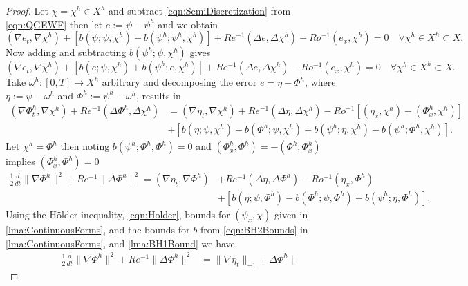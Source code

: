 \begin{proof}
  Let $\chi = \chi^h \in X^h$ and subtract \eqref{eqn:SemiDiscretization} from
  \eqref{eqn:QGEWF} then let $e:=\psi - \psi^h$ and we obtain
  \begin{equation*}
    (\nabla e_t, \nabla \chi^h) + \left[b(\psi;\psi,\chi^h) - b(\psi^h;\psi^h,\chi^h)\right]
      + Re^{-1}(\Delta e, \Delta \chi^h) - Ro^{-1} (e_x, \chi^h) = 0\quad
      \forall \chi^h \in X^h \subset X.
  \end{equation*}
  Now adding and subtracting $b(\psi^h;\psi,\chi^h)$ gives
  \begin{equation*}
    (\nabla e_t, \nabla \chi^h) + \left[b(e;\psi,\chi^h) + b(\psi^h;e,\chi^h)\right]
      + Re^{-1}(\Delta e, \Delta \chi^h) - Ro^{-1} (e_x, \chi^h) = 0\quad
      \forall \chi^h \in X^h \subset X.
  \end{equation*}
  Take $\omega^h:[0,T] \to X^h$ arbitrary and decomposing the error $e = \eta -
  \Phi^h$, where $\eta := \psi - \omega^h$ and $\Phi^h := \psi^h - \omega^h$,
  results in
  \begin{align*}
    (\nabla \Phi^h_t, \nabla \chi^h) + Re^{-1}(\Delta \Phi^h, \Delta \chi^h)
      & = (\nabla \eta_t, \nabla \chi^h) + Re^{-1}(\Delta \eta, \Delta \chi^h)
      - Ro^{-1} \left[(\eta_x, \chi^h) - (\Phi^h_x, \chi^h)\right] \\
    & + \left[ b(\eta;\psi,\chi^h) - b(\Phi^h;\psi,\chi^h)
      + b(\psi^h;\eta,\chi^h) - b(\psi^h;\Phi^h,\chi^h)\right].
  \end{align*}
  Let $\chi^h = \Phi^h$ then noting $b(\psi^h;\Phi^h,\Phi^h) = 0$ and $(\Phi^h_x,
  \Phi^h) = -(\Phi^h,\Phi^h_x)$ implies $(\Phi^h_x,\Phi^h) = 0$
  \begin{align*}
    \frac{1}{2} \frac{d}{dt} \|\nabla \Phi^h\|^2 + Re^{-1}\|\Delta \Phi^h\|^2
       = (\nabla \eta_t, \nabla \Phi^h) &+ Re^{-1}(\Delta \eta, \Delta \Phi^h)
      - Ro^{-1} (\eta_x, \Phi^h) \\
    & + \left[ b(\eta;\psi,\Phi^h) - b(\Phi^h;\psi,\Phi^h)
      + b(\psi^h;\eta,\Phi^h)\right].
  \end{align*}
  Using the H\"older inequality, \eqref{eqn:Holder}, bounds for $(\psi_x,\chi)$ given in
  \autoref{lma:ContinuousForms}, and the bounds for $b$ from
  \autoref{eqn:BH2Bounds} in \autoref{lma:ContinuousForms}, and \autoref{lma:BH1Bound} we have
  \begin{equation}
    \begin{split}
      \frac{1}{2} \frac{d}{dt} \|\nabla \Phi^h\|^2 + Re^{-1}\|\Delta \Phi^h\|^2
        &= \|\nabla \eta_t\|_{-1} \|\Delta \Phi^h\|

\end{split}
\end{equation}
\end{proof}
